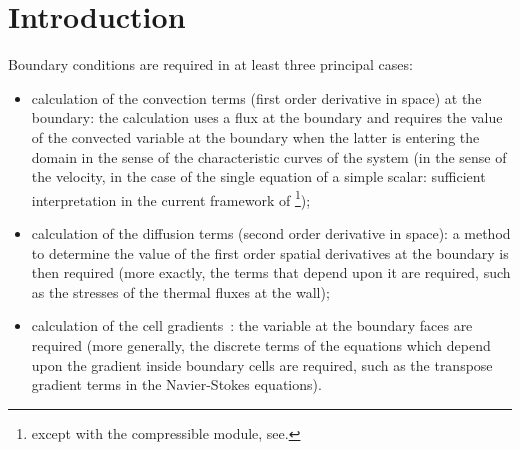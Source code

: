 
%
%
%
%

\section{Introduction}

Boundary conditions are required in at least three principal cases:
 
\begin{itemize}
\item calculation of the convection terms (first order derivative in space) at
the boundary: the calculation uses a flux at the boundary and requires the 
value of the convected variable at the boundary when the latter is entering 
the domain in the sense of the characteristic curves of the system (in the sense
of the velocity, in the case of the single equation of a simple scalar: 
 sufficient interpretation in the current framework of 
\CS\footnote{except with the compressible module, see. });
\item calculation of the diffusion terms (second order derivative
in space):
a method to determine the value of the first order spatial derivatives 
at the boundary is then required 
 (more exactly, the terms that depend upon it are required,
 such as the stresses of the thermal fluxes at the wall);
\item calculation of the cell  gradients~: the variable at the boundary faces
 are required (more generally, the discrete terms of the equations which depend
upon the gradient inside boundary cells are required, such as the transpose
gradient terms in the Navier-Stokes equations). 
\end{itemize}

